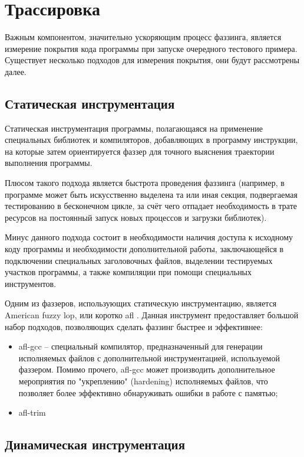 \section{Трассировка}\label{sec:trace}

Важным компонентом, значительно ускоряющим процесс фаззинга, является измерение покрытия кода программы при запуске очередного тестового примера. Существует несколько подходов для измерения покрытия, они будут рассмотрены далее.


\subsection{Статическая инструментация}

Статическая инструментация программы, полагающаяся на применение специальных библиотек и компиляторов, добавляющих в программу инструкции, на которые затем ориентируется фаззер для точного выяснения траектории выполнения программы.

Плюсом такого подхода является быстрота проведения фаззинга (например, в программе может быть искусственно выделена та или иная секция, подвергаемая тестированию в бесконечном цикле, за счёт чего отпадает необходимость в трате ресурсов на постоянный запуск новых процессов и загрузки библиотек).

Минус данного подхода состоит в необходимости наличия доступа к исходному коду программы и необходимости дополнительной работы, заключающейся в подключении специальных заголовочных файлов, выделении тестируемых участков программы, а также компиляции при помощи специальных инструментов.

Одним из фаззеров, использующих статическую инструментацию, является American fuzzy lop, или коротко afl \cite{afl}. Данная инструмент предоставляет большой набор подходов, позволяющих сделать фаззинг быстрее и эффективнее:

\begin{itemize}
	\item afl-gcc -- специальный компилятор, предназначенный для генерации исполняемых файлов с дополнительной инструментацией, используемой фаззером. Помимо прочего, afl-gcc может производить дополнительное мероприятия по "укреплению" (hardening) исполняемых файлов, что позволяет более эффективно обнаруживать ошибки в работе с памятью; 
	\item afl-trim %
\end{itemize}

\subsection{Динамическая инструментация}

